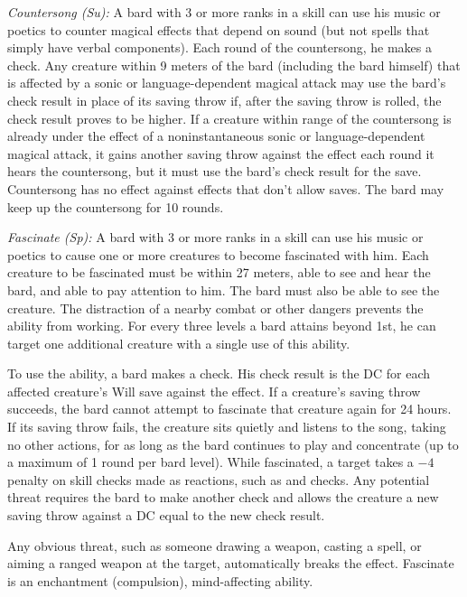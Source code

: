 \textit{Countersong (Su):} A bard with 3 or more ranks in a  skill can use his music or poetics to counter magical effects that depend on sound (but not spells that simply have verbal components). Each round of the countersong, he makes a  check. Any creature within 9 meters of the bard (including the bard himself) that is affected by a sonic or language-dependent magical attack may use the bard's  check result in place of its saving throw if, after the saving throw is rolled, the  check result proves to be higher. If a creature within range of the countersong is already under the effect of a noninstantaneous sonic or language-dependent magical attack, it gains another saving throw against the effect each round it hears the countersong, but it must use the bard's  check result for the save. Countersong has no effect against effects that don't allow saves. The bard may keep up the countersong for 10 rounds.

\textit{Fascinate (Sp):} A bard with 3 or more ranks in a  skill can use his music or poetics to cause one or more creatures to become fascinated with him. Each creature to be fascinated must be within 27 meters, able to see and hear the bard, and able to pay attention to him. The bard must also be able to see the creature. The distraction of a nearby combat or other dangers prevents the ability from working. For every three levels a bard attains beyond 1st, he can target one additional creature with a single use of this ability.

To use the ability, a bard makes a  check. His check result is the DC for each affected creature's Will save against the effect. If a creature's saving throw succeeds, the bard cannot attempt to fascinate that creature again for 24 hours. If its saving throw fails, the creature sits quietly and listens to the song, taking no other actions, for as long as the bard continues to play and concentrate (up to a maximum of 1 round per bard level). While fascinated, a target takes a $-4$ penalty on skill checks made as reactions, such as  and  checks. Any potential threat requires the bard to make another  check and allows the creature a new saving throw against a DC equal to the new  check result.

Any obvious threat, such as someone drawing a weapon, casting a spell, or aiming a ranged weapon at the target, automatically breaks the effect. Fascinate is an enchantment (compulsion), mind-affecting ability.

